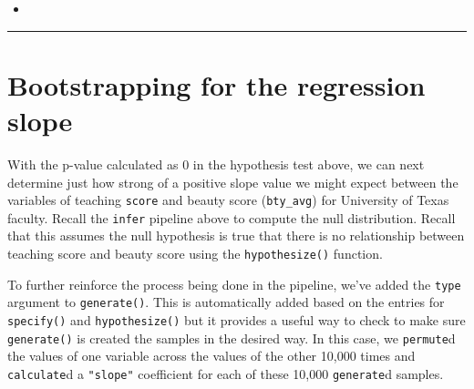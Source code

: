 \documentclass[12pt, krantz2,]{krantz}
\makeatletter
\newenvironment{Shaded}{\begin{snugshade}}{\end{snugshade}}
\newcommand{\DataTypeTok}[1]{\textcolor[rgb]{0.27,0.27,0.27}{#1}}
\newcommand{\DecValTok}[1]{\textcolor[rgb]{0.06,0.06,0.06}{#1}}
\newcommand{\KeywordTok}[1]{\textcolor[rgb]{0.27,0.27,0.27}{\textbf{#1}}}
\newcommand{\NormalTok}[1]{#1}
\newcommand{\OperatorTok}[1]{\textcolor[rgb]{0.43,0.43,0.43}{\textbf{#1}}}
\newcommand{\StringTok}[1]{\textcolor[rgb]{0.5,0.5,0.5}{#1}}
\newenvironment{kframe}{%
\medskip{}
\setlength{\fboxsep}{.8em}
 \def\at@end@of@kframe{}%
 \ifinner\ifhmode%
  \def\at@end@of@kframe{\end{minipage}}%
  \begin{minipage}{\columnwidth}%
 \fi\fi%
 \def\FrameCommand##1{\hskip\@totalleftmargin \hskip-\fboxsep
 \colorbox{shadecolor}{##1}\hskip-\fboxsep
     \hskip-\linewidth \hskip-\@totalleftmargin \hskip\columnwidth}%
 \MakeFramed {\advance\hsize-\width
   \@totalleftmargin\z@ \linewidth\hsize
   \@setminipage}}%
 {\par\unskip\endMakeFramed%
 \at@end@of@kframe}
\renewenvironment{Shaded}{\begin{kframe}}{\end{kframe}}
\newenvironment{rmdblock}[1]
  {\begin{shaded*}
  \begin{itemize}
  \renewcommand{\labelitemi}{
    \raisebox{-.7\height}[0pt][0pt]{
    }
  }
  \item
  }
  {
  \end{itemize}
  \end{shaded*}
  }
\newenvironment{learncheck}
  {\begin{rmdblock}{warning}}
  {\end{rmdblock}}
\makeatother
\begin{document}
\begin{learncheck}

\end{learncheck}

\begin{center}\rule{0.5\linewidth}{\linethickness}\end{center}

\hypertarget{bootstrapping-for-the-regression-slope}{%
\section{Bootstrapping for the regression slope}\label{bootstrapping-for-the-regression-slope}}

With the p-value calculated as 0 in the hypothesis test above, we can next determine just how strong of a positive slope value we might expect between the variables of teaching \texttt{score} and beauty score (\texttt{bty\_avg}) for University of Texas faculty. Recall the \texttt{infer} pipeline above to compute the null distribution. Recall that this assumes the null hypothesis is true that there is no relationship between teaching score and beauty score using the \texttt{hypothesize()} function.

\begin{Shaded}
\end{Shaded}

To further reinforce the process being done in the pipeline, we've added the \texttt{type} argument to \texttt{generate()}. This is automatically added based on the entries for \texttt{specify()} and \texttt{hypothesize()} but it provides a useful way to check to make sure \texttt{generate()} is created the samples in the desired way. In this case, we \texttt{permute}d the values of one variable across the values of the other 10,000 times and \texttt{calculate}d a \texttt{"slope"} coefficient for each of these 10,000 \texttt{generate}d samples.
\end{document}
